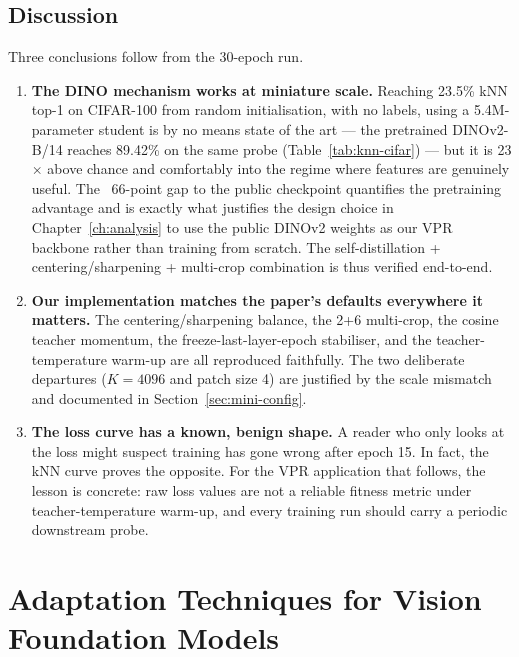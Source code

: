 \documentclass[11pt,a4paper]{article}
\begin{document}
\subsection{Discussion}

Three conclusions follow from the 30-epoch run.

\begin{enumerate}[leftmargin=*]
\item \textbf{The DINO mechanism works at miniature scale.} Reaching
23.5\% kNN top-1 on CIFAR-100 from random initialisation, with no
labels, using a 5.4M-parameter student is by no means state of the
art --- the pretrained DINOv2-B/14 reaches 89.42\% on the same probe
(Table~\ref{tab:knn-cifar}) --- but it is 23$\times$ above chance and
comfortably into the regime where features are genuinely useful. The
~66-point gap to the public checkpoint quantifies the pretraining
advantage and is exactly what justifies the design choice in Chapter~\ref{ch:analysis}
to use the public DINOv2 weights as our VPR backbone rather than
training from scratch. The self-distillation + centering/sharpening +
multi-crop combination is thus verified end-to-end.

\item \textbf{Our implementation matches the paper's defaults everywhere
it matters.} The centering/sharpening balance, the 2+6 multi-crop, the
cosine teacher momentum, the freeze-last-layer-epoch stabiliser, and
the teacher-temperature warm-up are all reproduced faithfully. The two
deliberate departures ($K=4096$ and patch size 4) are justified by the
scale mismatch and documented in Section~\ref{sec:mini-config}.

\item \textbf{The loss curve has a known, benign shape.} A reader who
only looks at the loss might suspect training has gone wrong after
epoch 15. In fact, the kNN curve proves the opposite. For the VPR
application that follows, the lesson is concrete: raw loss values are
not a reliable fitness metric under teacher-temperature warm-up, and
every training run should carry a periodic downstream probe.
\end{enumerate}

\newpage
\section{Adaptation Techniques for Vision Foundation Models}
\label{ch:adapt}
\end{document}
